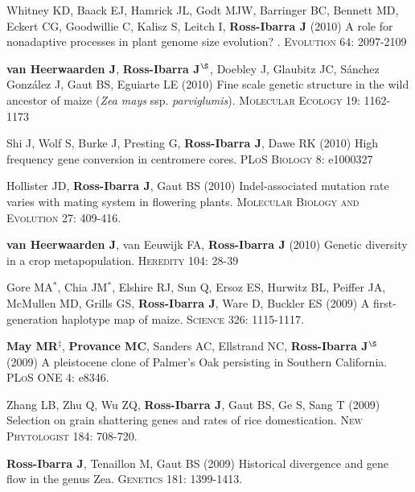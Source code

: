 \begin{etaremune}
\item Whitney KD, Baack EJ, Hamrick JL, Godt MJW, Barringer BC, Bennett MD, Eckert CG, Goodwillie C, Kalisz S, Leitch I, {\bf Ross-Ibarra J} (2010) A role for nonadaptive processes in plant genome size evolution? . \textsc{Evolution} 64: 2097-2109


\item {\bf van Heerwaarden J}, {\bf Ross-Ibarra J}$^\S$, Doebley J, Glaubitz JC, S\'{a}nchez Gonz\'{a}lez J, Gaut BS, Eguiarte LE (2010) Fine scale genetic structure in the wild ancestor of maize (\emph{Zea mays} ssp. \emph{parviglumis}).  \textsc{Molecular Ecology} 19: 1162-1173


\item Shi J, Wolf S, Burke J, Presting G, {\bf Ross-Ibarra J}, Dawe RK (2010) High frequency gene conversion in centromere cores.  \textsc{PLoS Biology} 8: e1000327


\item Hollister JD, {\bf Ross-Ibarra J}, Gaut BS (2010) Indel-associated mutation rate varies with mating system in flowering plants.  \textsc{Molecular Biology and Evolution} 27: 409-416.

\item {\bf van Heerwaarden J}, van Eeuwijk FA, {\bf Ross-Ibarra J} (2010) Genetic diversity in a crop metapopulation.  \textsc{Heredity} 104: 28-39


\item Gore MA$^*$, Chia JM$^*$, Elshire RJ, Sun Q, Ersoz ES, Hurwitz BL, Peiffer JA, McMullen MD, Grills GS, {\bf Ross-Ibarra J}, Ware D, Buckler ES (2009) A first-generation haplotype map of maize.  \textsc{Science 326}: 1115-1117.


\item {\bf May MR}$^\ddagger$, {\bf Provance MC}, Sanders AC, Ellstrand NC, {\bf Ross-Ibarra J}$^\S$ (2009) A pleistocene clone of Palmer's Oak persisting in Southern California.  \textsc{PLoS ONE} 4: e8346.


\item Zhang LB, Zhu Q, Wu ZQ, {\bf Ross-Ibarra J}, Gaut BS, Ge S, Sang T (2009) Selection on grain shattering genes and rates of rice domestication.  \textsc{New Phytologist} 184: 708-720.

\item {\bf Ross-Ibarra J}, Tenaillon M, Gaut BS (2009) Historical divergence and gene flow in the genus Zea.  \textsc{Genetics} 181: 1399-1413.



\end{etaremune}
